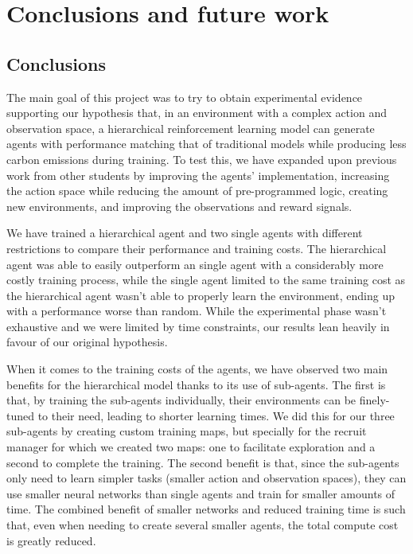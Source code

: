 \chapter{Conclusions and future work}
\label{chapter:conclusions}

\section{Conclusions}

The main goal of this project was to try to obtain experimental evidence supporting our hypothesis that, in an environment with a complex action and observation space, a hierarchical reinforcement learning model can generate agents with performance matching that of traditional models while producing less carbon emissions during training. To test this, we have expanded upon previous work from other students by improving the agents' implementation, increasing the action space while reducing the amount of pre-programmed logic, creating new environments, and improving the observations and reward signals.

We have trained a hierarchical agent and two single agents with different restrictions to compare their performance and training costs. The hierarchical agent was able to easily outperform an single agent with a considerably more costly training process, while the single agent limited to the same training cost as the hierarchical agent wasn't able to properly learn the environment, ending up with a performance worse than random. While the experimental phase wasn't exhaustive and we were limited by time constraints, our results lean heavily in favour of our original hypothesis.

When it comes to the training costs of the agents, we have observed two main benefits for the hierarchical model thanks to its use of sub-agents. The first is that, by training the sub-agents individually, their environments can be finely-tuned to their need, leading to shorter learning times. We did this for our three sub-agents by creating custom training maps, but specially for the recruit manager for which we created two maps: one to facilitate exploration and a second to complete the training. The second benefit is that, since the sub-agents only need to learn simpler tasks (smaller action and observation spaces), they can use smaller neural networks than single agents and train for smaller amounts of time. The combined benefit of smaller networks and reduced training time is such that, even when needing to create several smaller agents, the total compute cost is greatly reduced.

